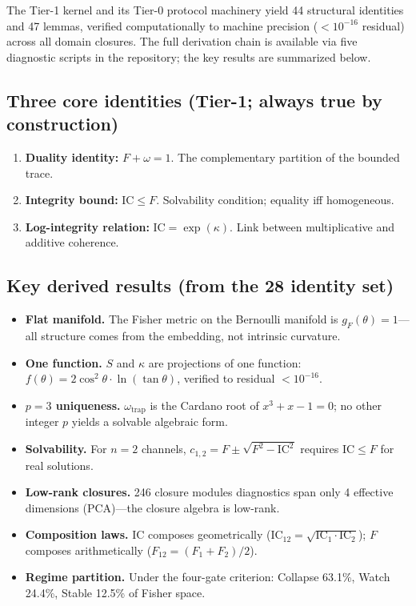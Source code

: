 \documentclass[
  aps,
  prd,
  preprint,
  superscriptaddress,
  nofootinbib,
  floatfix
]{revtex4-2}
\newcommand{\IC}{\mathrm{IC}}
\begin{document}
The Tier-1 kernel and its Tier-0 protocol machinery yield 44 structural identities and 47 lemmas,
verified computationally to machine precision ($<10^{-16}$ residual) across all domain closures.
The full derivation chain is available via five diagnostic scripts in the repository;
the key results are summarized below.

\subsection{Three core identities (Tier-1; always true by construction)}
\begin{enumerate}[leftmargin=2.2em]
  \item \textbf{Duality identity:} $F+\omega=1$. The complementary partition of the bounded trace.
  \item \textbf{Integrity bound:} $\IC \le F$. Solvability condition; equality iff homogeneous.
  \item \textbf{Log-integrity relation:} $\IC = \exp(\kappa)$. Link between multiplicative and additive coherence.
\end{enumerate}

\subsection{Key derived results (from the 28 identity set)}
\begin{itemize}[leftmargin=1.6em]
  \item \textbf{Flat manifold.} The Fisher metric on the Bernoulli manifold is $g_F(\theta)=1$---all structure comes from
  the embedding, not intrinsic curvature.
  \item \textbf{One function.} $S$ and $\kappa$ are projections of one function: $f(\theta)=2\cos^2\theta\cdot\ln(\tan\theta)$,
  verified to residual $<10^{-16}$.
  \item \textbf{$p=3$ uniqueness.} $\omega_{\mathrm{trap}}$ is the Cardano root of $x^3+x-1=0$; no other integer $p$ yields
  a solvable algebraic form.
  \item \textbf{Solvability.} For $n=2$ channels, $c_{1,2}=F\pm\sqrt{F^2-\IC^2}$ requires $\IC\le F$ for real solutions.
  \item \textbf{Low-rank closures.} 246 closure modules diagnostics span only 4 effective dimensions (PCA)---the closure algebra is low-rank.
  \item \textbf{Composition laws.} $\IC$ composes geometrically ($\IC_{12}=\sqrt{\IC_1\cdot\IC_2}$); $F$ composes
  arithmetically ($F_{12}=(F_1+F_2)/2$).
  \item \textbf{Regime partition.} Under the four-gate criterion: Collapse 63.1\%, Watch 24.4\%, Stable 12.5\% of Fisher space.
\end{itemize}
\end{document}
